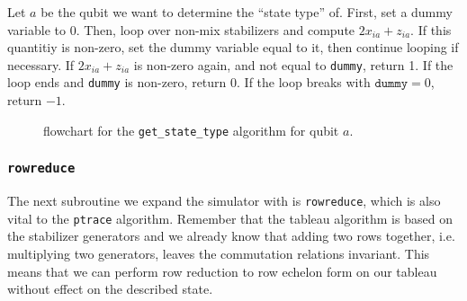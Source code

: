 \begin{alg}\label{alg:get_state_type}
  Let $a$ be the qubit we want to determine the \enquote{state type} of. First,
  set a dummy variable to $0$. Then, loop over non-mix stabilizers and compute
  $2x_{ia} + z_{ia}$. If this quantitiy is non-zero, set the dummy variable
  equal to it, then continue looping if necessary. If $2x_{ia}+z_{ia}$ is
  non-zero again, and not equal to \verb|dummy|, return 1. If the loop ends and
  \verb|dummy| is non-zero, return 0. If the loop breaks with
  $\texttt{dummy}=0$, return $-1$.
\end{alg}
\begin{figure}[H]
  \centering
  
  \caption{flowchart for the \texttt{get\_state\_type} algorithm for qubit $a$.}
  \label{fig:statetype-diag}
\end{figure}
%
\subsubsection{\texttt{rowreduce}}
The next subroutine we expand the simulator with is \texttt{rowreduce}, which
is also vital to the \verb|ptrace| algorithm. Remember that the tableau
algorithm is based on the stabilizer generators and we already know that adding
two rows together, i.e. multiplying two generators, leaves the commutation
relations invariant. This means that we can perform row reduction to row
echelon form on our tableau without effect on the described state.

